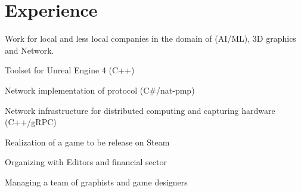 \documentclass[a4paper]{deedy-resume} %
\begin{document}
\hfill%
%
%
\begin{minipage}[t]{0.66\textwidth} %


\section{Experience}


	Work for local and less local companies in the domain of (AI/ML), 3D graphics and Network.
	\vspace{\topsep} %
	\begin{tightitemize}
		\item Toolset for Unreal Engine 4 (C++)
		\item Network implementation of protocol (C#/nat-pmp)
		\item Network infrastructure for distributed computing and capturing hardware (C++/gRPC)
	\end{tightitemize}

\sectionspace


	Realization of a game to be release on Steam
	\begin{tightitemize}
		\item Organizing with Editors and financial sector
		\item Managing a team of graphists and game designers
	\end{tightitemize}

\sectionspace %



\end{minipage}
\end{document}
